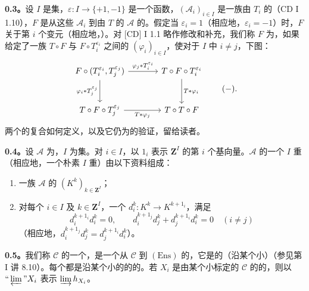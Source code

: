 \textbf{0.3。}设 $I$ 是集，$\varepsilon:I\to\{+1,-1\}$ 是一个函数，$(\mathcal A_i)_{i\in I}$ 是一族由 $T_i$ 的（CD I 1.10），$F$ 是从这些 $\mathcal A_i$ 到由 $T$ 的 $\mathcal A$ 的。假定当 $\varepsilon_i=1$（相应地，$\varepsilon_i=-1$）时，$F$ 关于第 $i$ 个变元（相应地，）。对 [CD] I 1.1 略作修改和补充，我们称 $F$ 为，如果给定了一族 $T\circ F$ 与 $F\circ T_i^{\varepsilon_i}$ 之间的 $(\varphi_i)_{i\in I}$，使对于 $I$ 中 $i\ne j$，下图：
\[
\begin{tikzcd}[column sep=large,row sep=large]
F\circ(T_i^{\varepsilon_i},T_j^{\varepsilon_j}) \arrow[r,"\varphi_j*T_i^{\varepsilon_i}"] \arrow[d,"\varphi_i*T_j^{\varepsilon_j}"'] & T\circ F\circ T_i^{\varepsilon_i} \arrow[d,"T*\varphi_i"]\\
T\circ F\circ T_j^{\varepsilon_j} \arrow[r,"T*\varphi_j"'] & T\circ T\circ F
\end{tikzcd}\qquad(-).
\]
两个的复合如何定义，以及它仍为的验证，留给读者。

\textbf{0.4。}设 $\mathcal A$ 为，$I$ 为集。对 $i\in I$，以 $1_i$ 表示 $\mathbf Z^I$ 的第 $i$ 个基向量。$\mathcal A$ 的一个 $I$ 重（相应地，一个朴素 $I$ 重）由以下资料组成：
\begin{enumerate}
\item[(a)] 一族 $\mathcal A$ 的 $(K^k)_{k\in\mathbf Z^I}$；
\item[(b)] 对每个 $i\in I$ 及 $k\in\mathbf Z^I$，一个 $d_i^k:K^k\to K^{k+1_i}$，满足
\[
d_i^{k+1_i}d_i^k=0,\qquad d_i^{k+1_j}d_j^k+d_j^{k+1_i}d_i^k=0\quad(i\ne j)
\]
（相应地，$d_i^{k+1_j}d_j^k=d_j^{k+1_i}d_i^k$）。
\end{enumerate}

\textbf{0.5。}我们称 $\mathcal C$ 的一个，是一个从 $\mathcal C$ 到 $(\mathrm{Ens})$ 的，它是的（沿某个小）（参见第 I 讲 8.10）。每个都是沿某个小的的的。若 $X_i$ 是由某个小标定的 $\mathcal C$ 的的，则以 $\text{“}\varprojlim\text{”}X_i$ 表示 $\varinjlim h_{X_i}$。

